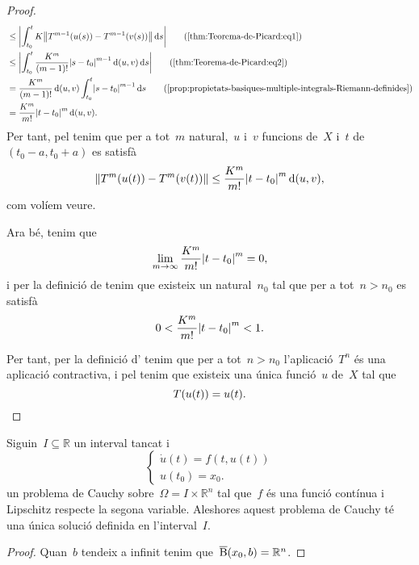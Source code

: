 \documentclass[../equacions-diferencials-I.tex]{subfiles}
\begin{document}
\begin{proof}
\begin{align*}
            &\leq\abs{\int_{t_{0}}^{t}K\norm{T^{m-1}(u(s))-T^{m-1}(v(s))}\diff s}\tag{\ref{thm:Teorema-de-Picard:eq1}}\\
            &\leq\abs{\int_{t_{0}}^{t}\frac{K^{m}}{(m-1)!}\abs{s-t_{0}}^{m-1}\distancia(u,v)\diff s}\tag{\ref{thm:Teorema-de-Picard:eq2}}\\
            &=\frac{K^{m}}{(m-1)!}\distancia(u,v)\int_{t_{0}}^{t}\abs{s-t_{0}}^{m-1}\diff s\tag{\ref{prop:propietats-basiques-multiple-integrals-Riemann-definides}}\\
            &=\frac{K^{m}}{m!}\abs{t-t_{0}}^{m}\distancia(u,v).%
        \end{align*}
        Per tant, pel  tenim que per a tot~\(m\) natural,~\(u\) i~\(v\) funcions de~\(X\) i~\(t\) de~\((t_{0}-a,t_{0}+a)\) es satisfà
        \[
            \norm{T^{m}(u(t))-T^{m}(v(t))}\leq\frac{K^{m}}{m!}\abs{t-t_{0}}^{m}\distancia(u,v),
        \]
        com volíem veure.

        Ara bé, tenim que
        \[
            \lim_{m\to\infty}\frac{K^{m}}{m!}\abs{t-t_{0}}^{m}=0,
        \]%
        i per la definició de  tenim que existeix un natural~\(n_{0}\) tal que per a tot~\(n>n_{0}\) es satisfà
        \[
            0<{\frac{K^{m}}{m!}\abs{t-t_{0}}^{m}}<1.
        \]

        Per tant, per la definició d' tenim que per a tot~\(n>n_{0}\) l'aplicació~\(T^{n}\) és una aplicació contractiva, i pel \corollari{}  tenim que existeix una única funció~\(u\) de~\(X\) tal que
        \[
            T(u(t))=u(t).\qedhere
        \]
    \end{proof}
    \begin{corollary}
        \label{cor:Teorema-de-Picard}
        Siguin~\(I\subseteq\mathbb{R}\) un interval tancat i
        \[\begin{cases}
            \displaystyle \dot{u}(t)=f(t,u(t)) \\
            \displaystyle u(t_{0})=x_{0}.
        \end{cases}\]
        un problema de Cauchy sobre~\(\Omega=I\times\mathbb{R}^{n}\) tal que~\(f\) és una funció contínua i Lipschitz respecte la segona variable.
        Aleshores aquest problema de Cauchy té una única solució definida en l'interval~\(I\).
    \end{corollary}
    \begin{proof}
        Quan~\(b\) tendeix a infinit tenim que~\(\overline{\operatorname{B}}(x_{0},b)=\mathbb{R}^{n}\).
    \end{proof}
\end{document}
